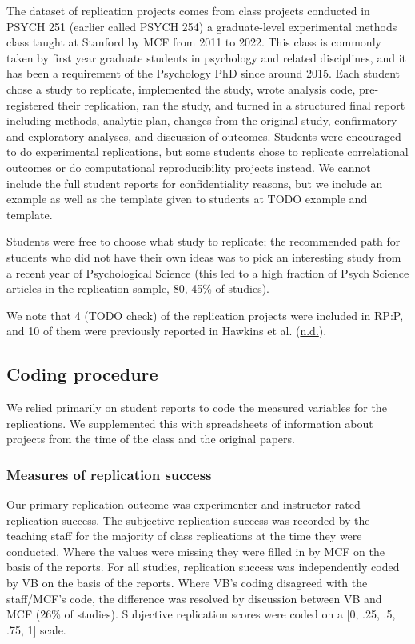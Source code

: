 \documentclass[
  english,
  a4paper,
]{article}
\begin{document}
The dataset of replication projects comes from class projects conducted in PSYCH 251 (earlier called PSYCH 254) a graduate-level experimental methods class taught at Stanford by MCF from 2011 to 2022. This class is commonly taken by first year graduate students in psychology and related disciplines, and it has been a requirement of the Psychology PhD since around 2015. Each student chose a study to replicate, implemented the study, wrote analysis code, pre-registered their replication, ran the study, and turned in a structured final report including methods, analytic plan, changes from the original study, confirmatory and exploratory analyses, and discussion of outcomes. Students were encouraged to do experimental replications, but some students chose to replicate correlational outcomes or do computational reproducibility projects instead. We cannot include the full student reports for confidentiality reasons, but we include an example as well as the template given to students at TODO example and template.

Students were free to choose what study to replicate; the recommended path for students who did not have their own ideas was to pick an interesting study from a recent year of Psychological Science (this led to a high fraction of Psych Science articles in the replication sample, 80, 45\% of studies).

We note that 4 (TODO check) of the replication projects were included in RP:P, and 10 of them were previously reported in Hawkins et al. (\protect\hyperlink{ref-hawkins}{n.d.}).

\hypertarget{coding-procedure}{%
\subsection{Coding procedure}\label{coding-procedure}}

We relied primarily on student reports to code the measured variables for the replications. We supplemented this with spreadsheets of information about projects from the time of the class and the original papers.

\hypertarget{measures-of-replication-success}{%
\subsubsection{Measures of replication success}\label{measures-of-replication-success}}

Our primary replication outcome was experimenter and instructor rated replication success. The subjective replication success was recorded by the teaching staff for the majority of class replications at the time they were conducted. Where the values were missing they were filled in by MCF on the basis of the reports. For all studies, replication success was independently coded by VB on the basis of the reports. Where VB's coding disagreed with the staff/MCF's code, the difference was resolved by discussion between VB and MCF (26\% of studies). Subjective replication scores were coded on a {[}0, .25, .5, .75, 1{]} scale.
\end{document}
